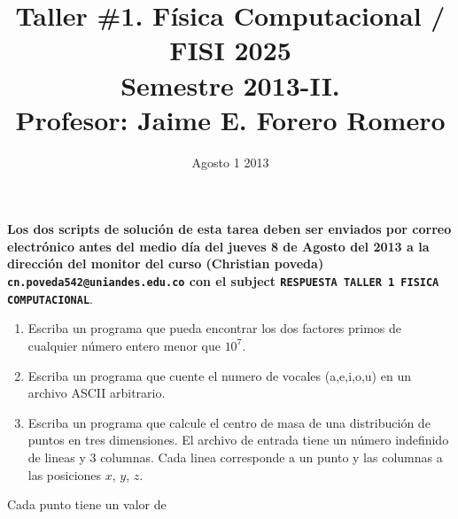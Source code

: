 \documentclass{article}
\title{Taller \#1. F\'isica Computacional / FISI 2025 \\Semestre 2013-II. \\ Profesor: Jaime E. Forero Romero}
\date{Agosto 1 2013}
\begin{document}
\maketitle

{\bf Los dos scripts de soluci\'on de esta tarea deben ser enviados por correo electr\'onico antes del medio d\'ia del jueves 8 de Agosto del 2013 a la direcci\'on del monitor del curso (Christian poveda) {\texttt{cn.poveda542@uniandes.edu.co}} con el subject \verb"RESPUESTA TALLER 1 FISICA COMPUTACIONAL"}.

\begin{enumerate}


\item Escriba un programa que pueda encontrar los dos factores primos de cualquier n\'umero entero menor que $10^7$.

\item Escriba un programa que cuente el numero de vocales (a,e,i,o,u) en un archivo ASCII arbitrario.

\item Escriba un programa que calcule el centro de masa de una distribuci\'on de puntos en tres dimensiones. El archivo de entrada tiene un n\'umero indefinido de lineas y 3 columnas. Cada linea corresponde a un punto y las columnas a las posiciones $x$, $y$, $z$. 

\end{enumerate}

Cada punto tiene un valor de 
\end{document}
